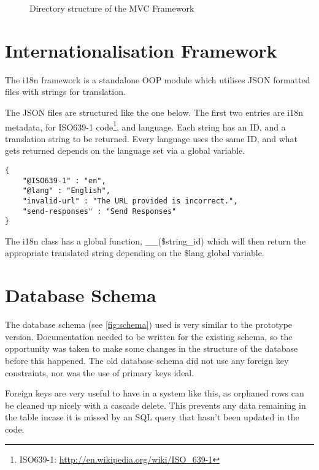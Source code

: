 	\begin{figure}[H]
		\caption{Directory structure of the \acs{MVC} Framework}
		\label{fig:mvcdirtree}
	\end{figure}	
	
	\section{Internationalisation Framework}
	\label{sec:i18nframework}
	
	The \ac{i18n} framework is a standalone \ac{OOP} module which utilises JSON formatted files with strings for translation.
	
	The JSON files are structured like the one below. The first two entries are \ac{i18n} metadata, for ISO639-1 code\footnote{ISO639-1: \url{http://en.wikipedia.org/wiki/ISO_639-1}}, and language.
	Each string has an ID, and a translation string to be returned.
	Every language uses the same ID, and what gets returned depends on the language set via a global variable.
	
	\begin{verbatim}
{
    "@ISO639-1" : "en",
    "@lang" : "English",
    "invalid-url" : "The URL provided is incorrect.",
    "send-responses" : "Send Responses"
}
	\end{verbatim}
	
	The \ac{i18n} class has a global function, \_\_(\$string\_id) which will then return the appropriate translated string depending on the \$lang global variable.
	
	\section{Database Schema}
	
	The database schema (see \autoref{fig:schema}) used is very similar to the prototype version.
	Documentation needed to be written for the existing schema, so the opportunity was taken to make some changes in the structure of the database before this happened.
	The old database schema did not use any foreign key constraints, nor was the use of primary keys ideal.
	
	Foreign keys are very useful to have in a system like this, as orphaned rows can be cleaned up nicely with a cascade delete.
	This prevents any data remaining in the table incase it is missed by an \ac{SQL} query that hasn't been updated in the code.
	
